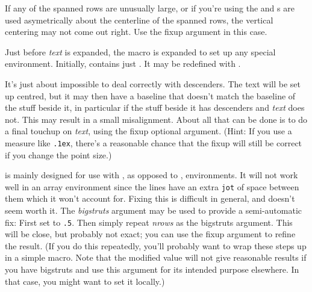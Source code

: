 \documentclass[a4paper]{article}
\begin{document}
If any of the spanned rows are unusually large, or if you're using the
 and s are used asymetrically about the
centerline of the spanned rows, the vertical centering may not come
out right.  Use the fixup argument in this case.

Just before \emph{text} is expanded, the  macro is
expanded to set up any special environment.  Initially,
 contains just .  It may be
redefined with .

It's just about impossible to deal correctly with descenders.  The
text will be set up centred, but it may then have a baseline that
doesn't match the baseline of the stuff beside it, in particular if
the stuff beside it has descenders and \emph{text} does not.  This may
result in a small misalignment.  About all that can be done is to do a
final touchup on \emph{text}, using the fixup optional argument.
(Hint:  If you use a measure like \texttt{.1ex}, there's a reasonable
chance that the fixup will still be correct if you change the point
size.)

 is mainly designed for use with , as
opposed to , environments.  It will not work well in an
array environment since the lines have an extra \texttt{jot} of space
between them which it won't account for.  Fixing this is difficult in
general, and doesn't seem worth it.  The \emph{bigstruts} argument may
be used to provide a semi-automatic fix: First set  to
\texttt{.5}.  Then simply repeat \emph{nrows} as the bigstruts
argument.  This will be close, but probably not exact; you can use the
fixup argument to refine the result.  (If you do this repeatedly,
you'll probably want to wrap these steps up in a simple macro.  Note
that the modified  value will not give reasonable
results if you have bigstruts and use this argument for its intended
purpose elsewhere.  In that case, you might want to set it locally.)
\end{document}
